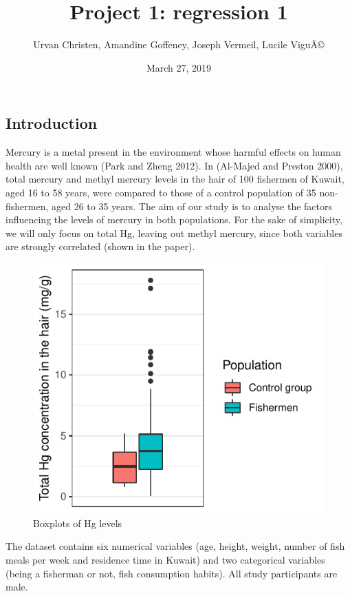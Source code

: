 \documentclass[12pt,]{article}
\title{Project 1: regression 1}
\author{Urvan Christen, Amandine Goffeney, Joseph Vermeil, Lucile ViguÃ©}
\date{March 27, 2019}
\begin{document}
\maketitle

\subsection{Introduction}\label{introduction}

Mercury is a metal present in the environment whose harmful effects on
human health are well known (Park and Zheng 2012). In (Al-Majed and
Preston 2000), total mercury and methyl mercury levels in the hair of
100 fishermen of Kuwait, aged 16 to 58 years, were compared to those of
a control population of 35 non-fishermen, aged 26 to 35 years. The aim
of our study is to analyse the factors influencing the levels of mercury
in both populations. For the sake of simplicity, we will only focus on
total Hg, leaving out methyl mercury, since both variables are strongly
correlated (shown in the paper).

\begin{figure}

\hfill{}\includegraphics{Report_files/figure-latex/unnamed-chunk-4-1} 

\caption{\label{fig:boxplots}Boxplots of Hg levels}\label{fig:unnamed-chunk-4}
\end{figure}

The dataset contains six numerical variables (age, height, weight,
number of fish meals per week and residence time in Kuwait) and two
categorical variables (being a fisherman or not, fish consumption
habits). All study participants are male.
\end{document}
